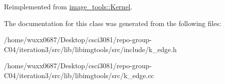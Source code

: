 Reimplemented from \hyperlink{classimage__tools_1_1Kernel_a214a76e32ad4bedf68045f8df423689a}{image\+\_\+tools\+::\+Kernel}.



The documentation for this class was generated from the following files\+:\begin{DoxyCompactItemize}
\item 
/home/wuxx0687/\+Desktop/csci3081/repo-\/group-\/\+C04/iteration3/src/lib/libimgtools/src/include/k\+\_\+edge.\+h\item 
/home/wuxx0687/\+Desktop/csci3081/repo-\/group-\/\+C04/iteration3/src/lib/libimgtools/src/k\+\_\+edge.\+cc\end{DoxyCompactItemize}
